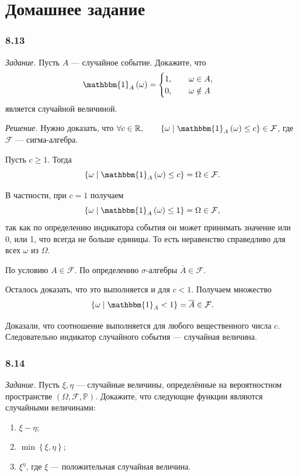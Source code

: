\section*{Домашнее задание}

\subsubsection*{8.13}

\textit{Задание.} Пусть $A$ --- случайное событие.
Докажите, что
$$ \mathbbm{1}_A \left( \omega \right) =
\begin{cases}
1, \qquad \omega \in A, \\
0, \qquad \omega \notin A
\end{cases}$$
является случайной величиной.

\textit{Решение.}
Нужно доказать,
что $ \forall c \in \mathbb{R}, \qquad \left\{ \omega \; \middle| \; \mathbbm{1}_A \left( \omega \right) \leq c \right\} \in \mathcal{F} $,
где $ \mathcal{F} $ --- сигма-алгебра.

Пусть $c \geq 1$.
Тогда
$$ \left\{ \omega \; \middle| \;
\mathbbm{1}_A \left( \omega \right) \leq
c \right\} =
\Omega \in
\mathcal{F}.$$

В частности, при $c = 1$ получаем
$$ \left\{ \omega \; \middle| \;
\mathbbm{1}_A \left( \omega \right) \leq
1 \right\} =
\Omega \in
\mathcal{F},$$
так как по определению индикатора события он может принимать значение или 0, или 1, что всегда не больше единицы.
То есть неравенство справедливо для всех $ \omega $ из $ \Omega $.

По условию $A \in \mathcal{F}$.
По определению $ \sigma $-алгебры $ \overline{A} \in \mathcal{F} $.

Осталось доказать, что это выполняется и для $c < 1$.
Получаем множество
$$ \left\{ \omega \; \middle| \;
\mathbbm{1}_A < 1 \right\} =
\overline{A} \in \mathcal{F}.$$

Доказали, что соотношение выполняется для любого вещественного числа $c$.
Следовательно индикатор случайного события --- случайная величина.

\subsubsection*{8.14}

\textit{Задание.} Пусть $ \xi, \eta $ --- случайные величины, определённые на вероятностном пространстве $ \left( \Omega, \mathcal{F}, \mathbb{P} \right) $.
Докажите, что следующие функции являются случайными величинами:
\begin{enumerate}[label=\alph*)]
\item $ \xi - \eta $;
\item $ \min \left\{ \xi, \eta \right\} $;
\item $ \xi^{ \eta } $, где $ \xi $ --- положительная случайная величина.
\end{enumerate}

